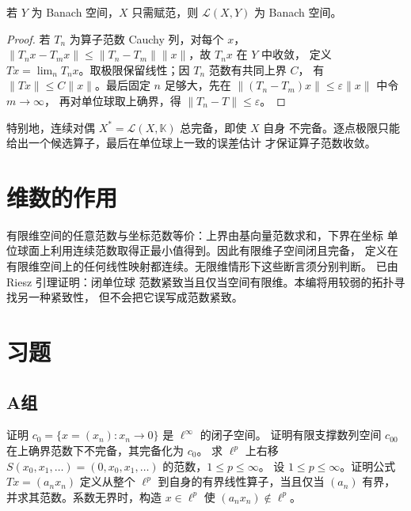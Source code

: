 \begin{theorem}\label{thm:operator-space-complete}
若 \(Y\) 为 Banach 空间，\(X\) 只需赋范，则 \(\mathcal L(X,Y)\) 为 Banach 空间。
\end{theorem}
\begin{proof}
若 \(T_n\) 为算子范数 Cauchy 列，对每个 \(x\)，
\(\|T_nx-T_mx\|\le\|T_n-T_m\|\|x\|\)，故 \(T_nx\) 在 \(Y\) 中收敛，
定义 \(Tx=\lim_nT_nx\)。取极限保留线性；因 \(T_n\) 范数有共同上界 \(C\)，
有 \(\|Tx\|\le C\|x\|\)。最后固定 \(n\) 足够大，先在
\(\|(T_n-T_m)x\|\le\varepsilon\|x\|\) 中令 \(m\to\infty\)，
再对单位球取上确界，得 \(\|T_n-T\|\le\varepsilon\)。
\end{proof}

特别地，连续对偶 \(X^*=\mathcal L(X,\mathbb K)\) 总完备，即使 \(X\) 自身
不完备。逐点极限只能给出一个候选算子，最后在单位球上一致的误差估计
才保证算子范数收敛。

\section{维数的作用}

有限维空间的任意范数与坐标范数等价：上界由基向量范数求和，下界在坐标
单位球面上利用连续范数取得正最小值得到。因此有限维子空间闭且完备，
定义在有限维空间上的任何线性映射都连续。无限维情形下这些断言须分别判断。
已由 Riesz 引理证明：闭单位球
范数紧致当且仅当空间有限维。本编将用较弱的拓扑寻找另一种紧致性，
但不会把它误写成范数紧致。

\section*{习题}
\subsection*{A组}
\begin{enumerate}[label=\textbf{\thechapter.\arabic*.}]
证明 \(c_0=\{x=(x_n):x_n\to0\}\) 是 \(\ell^\infty\) 的闭子空间。
证明有限支撑数列空间 \(c_{00}\) 在上确界范数下不完备，其完备化为 \(c_0\)。
求 \(\ell^p\) 上右移 \(S(x_0,x_1,\ldots)=(0,x_0,x_1,\ldots)\) 的范数，\(1\le p\le\infty\)。
设 \(1\le p\le\infty\)。证明公式 \(Tx=(a_nx_n)\) 定义从整个 \(\ell^p\) 到自身的有界线性算子，当且仅当 \((a_n)\) 有界，并求其范数。系数无界时，构造 \(x\in\ell^p\) 使 \((a_nx_n)\notin\ell^p\)。
\end{enumerate}
